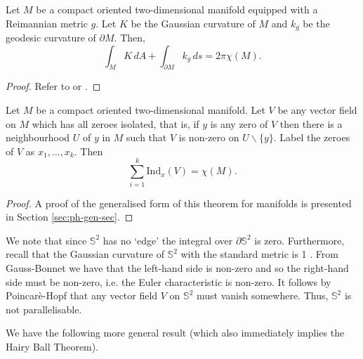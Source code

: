 \begin{theorem}
Let $M$ be a compact oriented two-dimensional manifold equipped with a Reimannian metric $g$. Let $K$ be the Gaussian curvature of $M$ and $k_g$ be the geodesic curvature of $\partial M$. Then,
\[
\int_MK\,dA+\int_{\partial M}k_g\,ds=2\pi\chi(M).
\] 
\end{theorem}
\begin{proof}
Refer to \cite{andrews} or \cite{guillemin2010differential}.
\end{proof}
\begin{theorem}
Let $M$ be a compact oriented two-dimensional manifold. Let $V$ be any vector field on $M$ which has all zeroes isolated, that is, if $y$ is any zero of $V$ then there is a neighbourhood $U$ of $y$ in $M$ such that $V$ is non-zero on $U\backslash\{y\}$. Label the zeroes of $V$ as $x_1,\ldots,x_k$. Then 
\[\sum_{i=1}^{k}\mathrm{Ind}_x(V)=\chi(M).\]
\label{thm:poinhopf}
\end{theorem}
\begin{proof}
A proof of the generalised form of this theorem for manifolds is presented in Section \ref{sec:ph-gen-sec}.
\end{proof}
%
\begin{remark}
We note that since $\mathbb{S}^2$ has no `edge' the integral over $\partial\mathbb{S}^2$ is zero. Furthermore, recall that the Gaussian curvature of $\mathbb{S}^2$ with the standard metric is 1 \cite{andrews}. From Gauss-Bonnet we have that the left-hand side is non-zero and so the right-hand side must be non-zero, i.e. the Euler characteristic is non-zero. It follows by Poincar\`{e}-Hopf that any vector field $V$ on $\mathbb{S}^2$ must vanish somewhere. Thus, $\mathbb{S}^2$ is not parallelisable. 
\end{remark} 
We have the following more general result (which also immediately implies the Hairy Ball Theorem).
